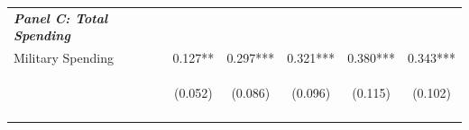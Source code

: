 \documentclass[dv_diss_main.tex]{subfiles}
\begin{document}
\begin{table}[H]
\begin{center}
{\begin{tabular}{lccccc}
     \multicolumn{1}{l}{\textit{\textbf{Panel C: Total Spending}}} \\ 
    Military Spending & 0.127** & 0.297*** & 0.321*** & 0.380*** & 0.343*** \\
     & \begin{footnotesize}(0.052)\end{footnotesize} & \begin{footnotesize}(0.086)\end{footnotesize} & \begin{footnotesize}(0.096)\end{footnotesize} & \begin{footnotesize}(0.115)\end{footnotesize} & \begin{footnotesize}(0.102)\end{footnotesize} \\
    \vspace{-1.5pt} & \vspace{-1.5pt} & \vspace{-1.5pt} & \vspace{-1.5pt} & \vspace{-1.5pt} \\
    

\end{tabular}}
\end{center}
\end{table}
\end{document}
